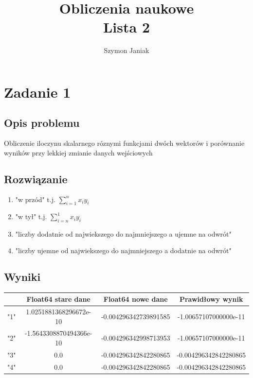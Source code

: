 \documentclass{article}
\title{%
	Obliczenia naukowe \\
	\large Lista 2}
\author{Szymon Janiak}
\begin{document}
\maketitle

\section*{Zadanie 1}
\subsection*{Opis problemu}
    Obliczenie iloczynu skalarnego róznymi funkcjami dwóch wektorów i porównanie wyników przy lekkiej zmianie danych wejściowych
\subsection*{Rozwiązanie}
    \begin{enumerate}
        \item "w przód" t.j. $\sum^n_{i=1} x_i y_i$
        \item "w tył" t.j. $\sum^1_{i=n} x_i y_i$
        \item "liczby dodatnie od najwiekszego do najmniejszego a ujemne na odwrót"
        \item "liczby ujemne od najwiekszego do najmniejszego a dodatnie na odwrót"
    \end{enumerate}
\subsection*{Wyniki}
    \begin{center}
        \begin{tabular}{|c|c|c|c|}
        \hline
            & Float64 stare dane & Float64 nowe dane & Prawidłowy wynik \\
            \hline\hline
            "1" & 1.0251881368296672e-10 & -0.004296342739891585 & -1.00657107000000e-11 \\
             \hline
             "2" & -1.5643308870494366e-10 & -0.004296342998713953 & -1.00657107000000e-11 \\
             \hline
             "3" & 0.0 & -0.004296342842280865 & -0.004296342842280865 \\
             \hline
             "4" & 0.0 & -0.004296342842280865 & -0.004296342842280865 \\
        \hline
        \end{tabular}
    \end{center}
\end{document}
